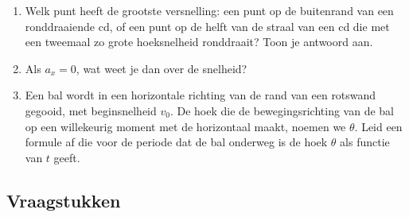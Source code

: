 \documentclass{ximera}
\begin{document}
\begin{enumerate}
\item Welk punt heeft de grootste versnelling: een punt op de buitenrand van een ronddraaiende cd, of een punt op de helft van de straal van een cd die met een tweemaal zo grote hoeksnelheid ronddraait? Toon je antwoord aan.

\item Als $a_x=0$, wat weet je dan over de snelheid?

\item Een bal wordt in een horizontale richting van de rand van een rotswand gegooid, met beginsnelheid $v_0$. De hoek die de bewegingsrichting van de bal op een willekeurig moment met de horizontaal maakt, noemen we $\theta$. Leid een formule af die voor de periode dat de bal onderweg is de hoek $\theta$ als functie van $t$ geeft.



\end{enumerate}

\subsection{Vraagstukken}
\end{document}
